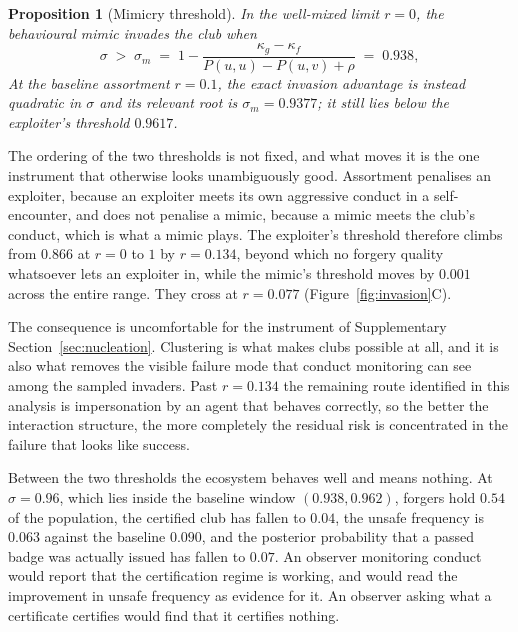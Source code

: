\documentclass[preprint,12pt]{elsarticle}
\theoremstyle{plain}
\newtheorem{proposition}[theorem]{Proposition}
\theoremstyle{definition}
\begin{document}
\begin{proposition}[Mimicry threshold]
\label{prop:mimicry}
In the well-mixed limit $r=0$, the behavioural mimic invades the club when
\begin{equation}
\label{eq:sigmam}
\sigma \;>\; \sigma_m \;=\; 1 - \frac{\kappa_g - \kappa_f}{P(u,u) - P(u,v) + \rho}
  \;=\; 0.938 ,
\end{equation}
At the baseline assortment $r=0.1$, the exact invasion advantage is instead
quadratic in $\sigma$ and its relevant root is $\sigma_m=0.9377$; it still lies
below the exploiter's threshold $0.9617$.
\end{proposition}

The ordering of the two thresholds is not fixed, and what moves it is the one
instrument that otherwise looks unambiguously good. Assortment penalises an
exploiter, because an exploiter meets its own aggressive conduct in a
self-encounter, and does not penalise a mimic, because a mimic meets the club's
conduct, which is what a mimic plays. The exploiter's threshold therefore
climbs from $0.866$ at $r = 0$ to $1$ by $r = 0.134$, beyond which no forgery
quality whatsoever lets an exploiter in, while the mimic's threshold moves by
$0.001$ across the entire range. They cross at $r = 0.077$
(Figure~\ref{fig:invasion}C).

The consequence is uncomfortable for the instrument of
Supplementary Section~\ref{sec:nucleation}. Clustering is what makes
clubs possible at all,
and it is also what removes the visible failure mode that conduct monitoring
can see among the sampled invaders. Past $r = 0.134$ the remaining route
identified in this analysis is impersonation
by an agent that behaves correctly, so the better the interaction structure,
the more completely the residual risk is concentrated in the failure that looks
like success.

Between the two thresholds the ecosystem behaves well and means nothing. At
$\sigma = 0.96$, which lies inside the baseline window $(0.938, 0.962)$,
forgers hold $0.54$ of the population, the certified club has
fallen to $0.04$, the unsafe frequency is $0.063$ against the baseline $0.090$,
and the posterior probability that a passed badge was actually issued has
fallen to $0.07$. An observer monitoring conduct would report that the
certification regime is working, and would read the improvement in unsafe
frequency as evidence for it. An observer asking what a certificate certifies
would find that it certifies nothing.
\end{document}
